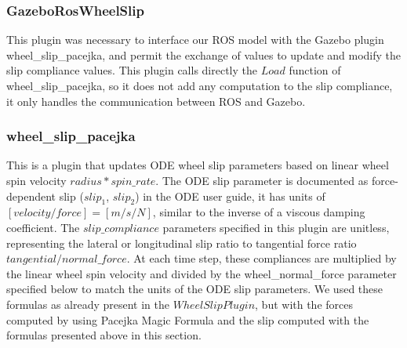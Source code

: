 \subsubsection{GazeboRosWheelSlip}
This plugin was necessary to interface our ROS model with the Gazebo plugin wheel\_slip\_pacejka, and permit the exchange of values to update and modify the slip compliance values.
This plugin calls directly the $Load$ function of wheel\_slip\_pacejka, so it does not add any computation to the slip compliance, it only handles the communication between ROS and Gazebo.

\subsubsection{wheel\_slip\_pacejka}
This is a plugin that updates ODE wheel slip parameters based on linear wheel spin velocity $radius * spin\_rate$. The ODE slip parameter is documented as force-dependent slip ($slip_1$, $slip_2$) in the ODE user guide, it has units of $[velocity / force] = [m / s / N]$, similar to the inverse of a viscous damping coefficient.
The $slip\_compliance$ parameters specified in this plugin are unitless, representing the lateral or longitudinal slip ratio to tangential force ratio $tangential / normal\_force$.
At each time step, these compliances are multiplied by the linear wheel spin velocity and divided by the wheel\_normal\_force parameter specified below to match the units of the ODE slip parameters.
We used these formulas as already present in the $WheelSlipPlugin$, but with the forces computed by using Pacejka Magic Formula and the slip computed with the formulas presented above in this section.

